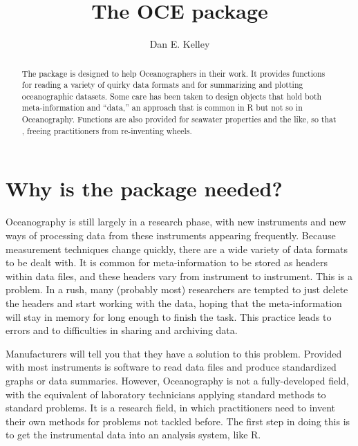 \documentclass{article}
\begin{document}
\title{The OCE package}
\author{Dan E. Kelley}
\maketitle


\begin{abstract}

The \verb@oce@ package is designed to help Oceanographers in their work. It provides functions
for reading a variety of quirky data formats and for summarizing and plotting oceanographic
datasets. Some care has been taken to design objects that hold both meta-information and
``data,'' an approach that is common in R but not so in Oceanography. Functions are also
provided for seawater properties and the like, so that \verb@oce@, freeing practitioners from
re-inventing wheels.

\end{abstract}

\section{Why is the package needed?}

Oceanography is still largely in a research phase, with new instruments and new ways of
processing data from these instruments appearing frequently. Because measurement techniques
change quickly, there are a wide variety of data formats to be dealt with. It is common for
meta-information to be stored as headers within data files, and these headers vary from
instrument to instrument. This is a problem. In a rush, many (probably most) researchers are
tempted to just delete the headers and start working with the data, hoping that the
meta-information will stay in memory for long enough to finish the task. This practice leads to
errors and to difficulties in sharing and archiving data.

Manufacturers will tell you that they have a solution to this problem. Provided with most
instruments is software to read data files and produce standardized graphs or data summaries.
However, Oceanography is not a fully-developed field, with the equivalent of laboratory
technicians applying standard methods to standard problems. It is a research field, in which
practitioners need to invent their own methods for problems not tackled before. The first step
in doing this is to get the instrumental data into an analysis system, like R.
\end{document}
